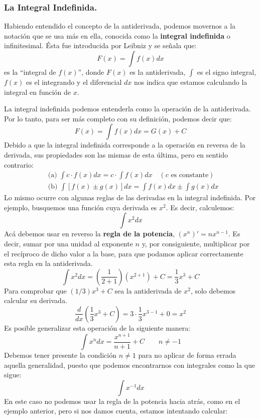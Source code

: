 \documentclass[12pt]{article}
\begin{document}
\subsubsection{La Integral Indefinida.}

Habiendo entendido el concepto de la antiderivada, podemos movernos a la notación que se usa más en ella, conocida como la \textbf{integral indefinida} o infinitesimal. Ésta fue introducida por Leibniz y se señala que:
\[
  F(x) = \int f(x) dx
\]
es la ``integral de $f(x)$'', donde $F(x)$ es la antiderivada, $\int$ es el signo integral, $f(x)$ es el integrando y el diferencial $dx$ nos indica que estamos calculando la integral en función de $x$.

La integral indefinida podemos entenderla como la operación de la antiderivada. Por lo tanto, para ser más completo con su definición, podemos decir que:
\[
  F(x) = \int f(x) dx = G(x) + C
\]
Debido a que la integral indefinida corresponde a la operación en reversa de la derivada, sus propiedades son las mismas de esta última, pero en sentido contrario:
\begin{align*}
  &\text{(a) } \int c \cdot f(x) dx = c \cdot \int f(x) dx \quad (c \text{ es constante}) \\
  &\text{(b) } \int [f(x) \pm g(x)] dx = \int f(x) dx \pm \int g(x) dx
\end{align*}
Lo mismo ocurre con algunas reglas de las derivadas en la integral indefinida. Por ejemplo, busquemos una función cuya derivada es $x^{2}$. Es decir, calculemos:
\[
  \int x^{2} dx
\]
Acá debemos usar en reverso la \textbf{regla de la potencia}, $(x^{n})' = nx^{n-1}$. Es decir, sumar por una unidad al exponente $n$ y, por consiguiente, multiplicar por el recíproco de dicho valor a la base, para que podamos aplicar correctamente esta regla en la antiderivada.
\[
  \int x^{2} dx = \left(\frac{1}{2 + 1}\right) (x^{2 + 1}) + C = \frac{1}{3} x^{3} + C
\]
Para comprobar que $(1/3) x^{3} + C$ sea la antiderivada de $x^{2}$, solo debemos calcular su derivada.
\[
  \frac{d}{dx} \left(\frac{1}{3} x^{3} + C\right) = 3 \cdot \frac{1}{3} x^{3 - 1} + 0 = x^{2}
\]
Es posible generalizar esta operación de la siguiente manera:
\[
  \int x^{n} dx = \frac{x^{n + 1}}{n + 1} + C \qquad n \neq -1
\]
Debemos tener presente la condición $n \neq 1$ para no aplicar de forma errada aquella generalidad, puesto que podemos encontrarnos con integrales como la que sigue:
\[
  \int x^{-1} dx
\]
En este caso no podemos usar la regla de la potencia hacia atrás, como en el ejemplo anterior, pero si nos damos cuenta, estamos intentando calcular:
\end{document}
